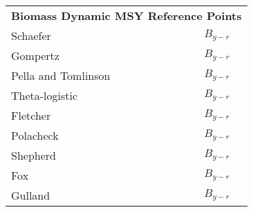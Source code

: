 \documentclass[11pt]{article}
\begin{document}
\begin{tabular}{lp{10cm}}
\multicolumn{2}{l}{\textbf{Biomass Dynamic MSY Reference Points}} \\
\addlinespace
Schaefer 		& \begin{equation} B_{y-r} \end{equation} \\
Gompertz		& \begin{equation} B_{y-r} \end{equation} \\
Pella and Tomlinson	& \begin{equation} B_{y-r} \end{equation} \\
Theta-logistic		& \begin{equation} B_{y-r} \end{equation} \\
Fletcher		& \begin{equation} B_{y-r} \end{equation} \\
Polacheck		& \begin{equation} B_{y-r} \end{equation} \\
Shepherd		& \begin{equation} B_{y-r} \end{equation} \\
Fox			& \begin{equation} B_{y-r} \end{equation} \\
Gulland			& \begin{equation} B_{y-r} \end{equation} \\



\end{tabular}
\end{document}
